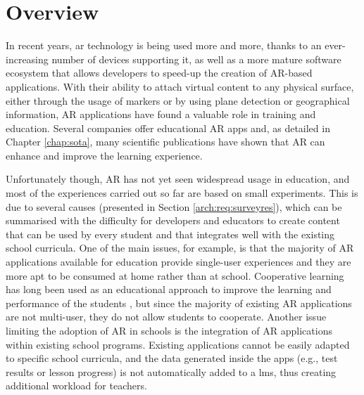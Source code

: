 \section{Overview}\label{sec:introduction}
In recent years, \gls{ar} technology is being used more and more, thanks to an ever-increasing number of devices supporting it, as well as a more mature software ecosystem that allows developers to speed-up the creation of AR-based applications. With their ability to attach virtual content to any physical surface, either through the usage of markers or by using plane detection or geographical information, AR applications have found a valuable role in training and education. Several companies offer educational AR apps and, as detailed in Chapter \ref{chap:sota}, many scientific publications have shown that AR can enhance and improve the learning experience.

Unfortunately though, AR has not yet seen widespread usage in education, and most of the experiences carried out so far are based on small experiments. This is due to several causes (presented in Section \ref{arch:req:surveyres}), which can be summarised with the difficulty for developers and educators to create content that can be used by every student and that integrates well with the existing school curricula. One of the main issues, for example, is that the majority of AR applications available for education provide single-user experiences and they are more apt to be consumed at home rather than at school. Cooperative learning has long been used as an educational approach to improve the learning and performance of the students \citep{Johnson19, kuh2011piecing}, but since the majority of existing AR applications are not multi-user, they do not allow students to cooperate.
Another issue limiting the adoption of AR in schools is the integration of AR applications within existing school programs. Existing applications cannot be easily adapted to specific school curricula, and the data generated inside the apps  (e.g., test results or lesson progress) is not automatically added to a \gls{lms}, thus creating additional workload for teachers. 

